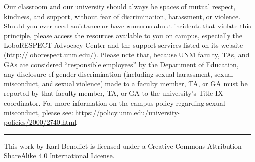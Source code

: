 \documentclass[
]{article}
\begin{document}
Our classroom and our university should always be spaces of mutual
respect, kindness, and support, without fear of discrimination,
harassment, or violence. Should you ever need assistance or have
concerns about incidents that violate this principle, please access the
resources available to you on campus, especially the LoboRESPECT
Advocacy Center and the support services listed on its website
(http://loborespect.unm.edu/). Please note that, because UNM faculty,
TAs, and GAs are considered ``responsible employees'' by the Department
of Education, any disclosure of gender discrimination (including sexual
harassment, sexual misconduct, and sexual violence) made to a faculty
member, TA, or GA must be reported by that faculty member, TA, or GA to
the university's Title IX coordinator. For more information on the
campus policy regarding sexual misconduct, please see:
\url{https://policy.unm.edu/university-policies/2000/2740.html}.

\begin{center}\rule{0.5\linewidth}{\linethickness}\end{center}

This work by {Karl Benedict} is licensed under a Creative Commons
Attribution-ShareAlike 4.0 International License.
\end{document}
